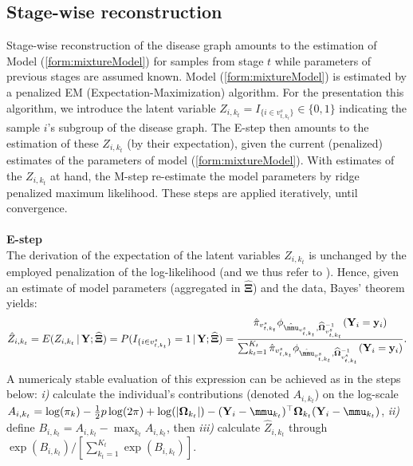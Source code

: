 \documentclass[10pt]{article}
\begin{document}
\subsection{Stage-wise reconstruction}
Stage-wise reconstruction of the disease graph amounts to the estimation of Model (\ref{form:mixtureModel}) for samples from stage $t$ while parameters of previous stages are assumed known. Model (\ref{form:mixtureModel}) is estimated by a penalized EM (Expectation-Maximization) algorithm. For the presentation this algorithm, we introduce the latent variable $Z_{i, k_t} = I_{\{ i \in v_{t,k_{t}}^s \}} \in \{ 0, 1\}$ indicating the sample $i$'s subgroup of the disease graph. The E-step then amounts to the estimation of these $Z_{i,k_t}$ (by their expectation), given the current (penalized) estimates of the parameters of model (\ref{form:mixtureModel}). With estimates of the $Z_{i,k_t}$ at hand, the M-step re-estimate the model parameters by ridge penalized maximum likelihood. These steps are applied iteratively, until convergence.
\\
\vspace{-5pt}
\\
\textbf{E-step}
\\
The derivation of the expectation of the latent variables $Z_{i, k_t}$ is unchanged by the employed penalization of the log-likelihood (and we thus refer to \citet{Titt1985}). Hence, given an estimate of model parameters (aggregated in $\widehat{\mathbf{\Xi}}$) and the data, Bayes' theorem yields:
\begin{eqnarray*}
\hat{Z}_{i, k_t} = E( Z_{i, k_t} \, | \, \mathbf{Y}; \widehat{\mathbf{\Xi}} ) = P(I_{\{ i \in v_{t,k_{t}}^s \}} = 1 \, | \, \mathbf{Y}; \widehat{\mathbf{\Xi}}) =
\frac{\hat{\pi}_{v_{t, k_t}^s} \phi_{\hat{\mmu}_{v_{t, k_t}^s}, \widehat{\mathbf{\Omega}}_{v_{t, k_t}^s}^{-1}} ( \mathbf{Y}_i = \mathbf{y}_i )}{
\sum_{k_t=1}^{K_t}  \hat{\pi}_{v_{t, k_t}^s} \phi_{\hat{\mmu}_{v_{t, k_t}^s}, \widehat{\mathbf{\Omega}}_{v_{t, k_t}^s}^{-1}} ( \mathbf{Y}_i = \mathbf{y}_i )}.
\end{eqnarray*}
A numericaly stable evaluation of this expression can be achieved as in the steps below: \textit{i)} calculate the individual's contributions (denoted $A_{i,k_t}$) on the log-scale $A_{i,k_t} = \log(\pi_k) - \tfrac{1}{2} p  \log(2\pi) + \log(|\mathbf{\Omega}_{k_t}|) - (\mathbf{Y}_i-\mmu_{k_t})^{\top}\mathbf{\Omega}_{k_t} (\mathbf{Y}_i-\mmu_{k_t})$, \textit{ii)} define $B_{i,k_t} = A_{i,k_t} - \max_{k_t} A_{i,k_t}$, then \textit{iii)} calculate $\hat{Z}_{i, k_t}$ through $\exp(B_{i,k_t}) / [ \sum_{k_t=1}^{K_t} \exp(B_{i,k_t}) ]$.
\end{document}
